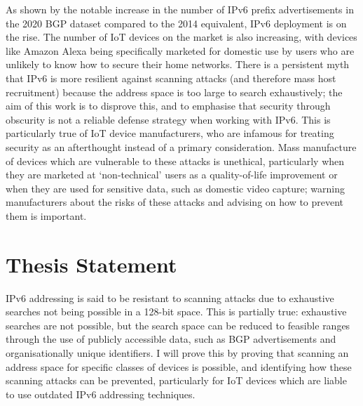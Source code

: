 \documentclass[10pt,sigconf]{acmart}
\begin{document}
As shown by the notable increase in the number of IPv6 prefix advertisements in the 2020 BGP dataset compared to the 2014 equivalent, IPv6 deployment is on the rise.
The number of IoT devices on the market is also increasing, with devices like Amazon Alexa being specifically marketed for domestic use by users who are unlikely to know how to secure their home networks.
There is a persistent myth that IPv6 is more resilient against scanning attacks (and therefore mass host recruitment) because the address space is too large to search exhaustively;
the aim of this work is to disprove this, and to emphasise that security through obscurity is not a reliable defense strategy when working with IPv6.
This is particularly true of IoT device manufacturers, who are infamous for treating security as an afterthought instead of a primary consideration.
Mass manufacture of devices which are vulnerable to these attacks is unethical, particularly when they are marketed at `non-technical' users as a quality-of-life improvement or when they are used for sensitive data, such as domestic video capture;
warning manufacturers about the risks of these attacks and advising on how to prevent them is important.

\section{Thesis Statement}

IPv6 addressing is said to be resistant to scanning attacks due to exhaustive searches not being possible in a 128-bit space.
This is partially true:
exhaustive searches are not possible, but the search space can be reduced to feasible ranges through the use of publicly accessible data, such as BGP advertisements and organisationally unique identifiers.
I will prove this by proving that scanning an address space for specific classes of devices is possible, and identifying how these scanning attacks can be prevented, particularly for IoT devices which are liable to use outdated IPv6 addressing techniques.

%
\end{document}
